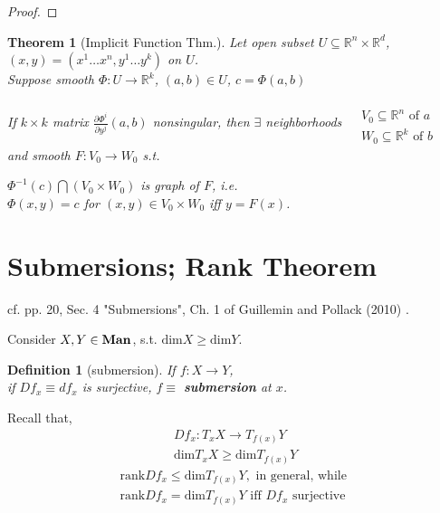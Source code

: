 \documentclass[10pt]{amsart}
\newtheorem{theorem}{Theorem}
\newtheorem{definition}{Definition}
\begin{document}
\begin{multicols*}{2}
\begin{proof}
\end{proof}






\begin{theorem}[Implicit Function Thm.]
  Let open subset $U\subseteq \mathbb{R}^n \times \mathbb{R}^d$, $(x,y) = (x^1 \dots x^n, y^1 \dots y^k) $ on $U$.  \\
  Suppose smooth $\Phi:U\to \mathbb{R}^k$, $(a,b) \in U$, $c=\Phi(a,b)$

  If $k\times k$ matrix $\frac{ \partial \Phi^i}{ \partial y^j}(a,b)$ nonsingular, then $\exists $ neighborhoods $\begin{aligned} & \quad \\
    & V_0 \subseteq \mathbb{R}^n \text{ of $a$ } \\
    & W_0 \subseteq \mathbb{R}^k \text{ of $b$ } \end{aligned}$ and smooth $F:V_0 \to W_0$ s.t.

  $\Phi^{-1}(c) \bigcap (V_0\times W_0)$ is graph of $F$, i.e. \\
  $\Phi(x,y) =c$ for $(x,y) \in V_0\times W_0$ iff $y=F(x)$.  
  \end{theorem}



\section{Submersions; Rank Theorem} 
cf. pp. 20, Sec. 4 "Submersions", Ch. 1 of Guillemin and Pollack (2010) \cite{VGuilleminAPollack2010}.  

Consider $X,Y\in \text{\textbf{Man}}$, s.t. $\text{dim}X \geq \text{dim}Y$.  

\begin{definition}[submersion] If $f:X\to Y$, \\
if $Df_x \equiv df_x$ is \emph{surjective}, $f\equiv $ \textbf{submersion} at $x$.
\end{definition}
Recall that,  
\[
\begin{gathered}
	Df_x:T_xX \to T_{f(x)}Y \\
	\text{dim}T_xX \geq \text{dim}T_{f(x)}Y
\end{gathered}
\]
\[
\begin{gathered}
\text{rank}Df_x \leq \text{dim}T_{f(x)}Y, \text{ in general, while } \\
\text{rank}Df_x = \text{dim}T_{f(x)}Y \text{ iff } Df_x \text{ surjective }
\end{gathered}
\]


\end{multicols*}
\end{document}
